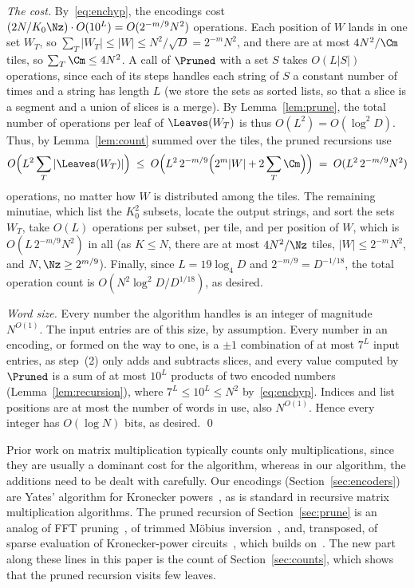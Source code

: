 \emph{The cost.} By~\eqref{eq:enchyp}, the encodings cost $(2N/K_0\Nz)\cdot O(10^L)=O(2^{-m/9}N^2)$ operations. Each position of $W$ lands in one set $W_T$, so $\sum_T|W_T|\le|W|\le N^2/\sqrt D=2^{-m}N^2$, and there are at most $4N^2/\Cm$ tiles, so $\sum_T\Cm\le4N^2$. A call of $\Pruned$ with a set $S$ takes $O(L|S|)$ operations, since each of its steps handles each string of $S$ a constant number of times and a string has length $L$ (we store the sets as sorted lists, so that a slice is a segment and a union of slices is a merge). By Lemma~\ref{lem:prune}, the total number of operations per leaf of $\Leaves(W_T)$ is thus $O(L^2)=O(\log^2\!D)$. Thus, by Lemma~\ref{lem:count} summed over the tiles, the pruned recursions use
\[
O\Big(L^2\sum_T|\Leaves(W_T)|\Big)\;\le\;O\Big(L^2\,2^{-m/9}\Big(2^m|W|+2\sum_T\Cm\Big)\Big)\;=\;O(L^2\,2^{-m/9}N^2)
\]
operations, no matter how $W$ is distributed among the tiles. The remaining minutiae, which list the $K_0^2$ subsets, locate the output strings, and sort the sets $W_T$, take $O(L)$ operations per subset, per tile, and per position of $W$, which is $O(L\,2^{-m/9}N^2)$ in all (as $K\le N$, there are at most $4N^2/\Nz$ tiles, $|W|\le2^{-m}N^2$, and $N,\Nz\ge2^{m/9}$). Finally, since $L=19\log_4D$ and $2^{-m/9}=D^{-1/18}$, the total operation count is $O(N^2\log^2\!D/D^{1/18})$, as desired.

\emph{Word size.} Every number the algorithm handles is an integer of magnitude $N^{O(1)}$. The input entries are of this size, by assumption. Every number in an encoding, or formed on the way to one, is a $\pm1$ combination of at most $7^L$ input entries, as step~(2) only adds and subtracts slices, and every value computed by $\Pruned$ is a sum of at most $10^L$ products of two encoded numbers (Lemma~\ref{lem:recursion}), where $7^L\le10^L\le N^2$ by~\eqref{eq:enchyp}. Indices and list positions are at most the number of words in use, also $N^{O(1)}$. Hence every integer has $O(\log N)$ bits, as desired. \qed

\begin{remark}
Prior work on matrix multiplication typically counts only multiplications, since they are usually a dominant cost for the algorithm, whereas in our algorithm, the additions need to be dealt with carefully. Our encodings (Section~\ref{sec:encoders}) are Yates' algorithm for Kronecker powers~\cite{Yat37,Goo58}, as is standard in recursive matrix multiplication algorithms. The pruned recursion of Section~\ref{sec:prune} is an analog of FFT pruning~\cite{Mar71,SB93}, of trimmed M\"obius inversion~\cite{BHKK10}, and, transposed, of sparse evaluation of Kronecker-power circuits~\cite{AL25}, which builds on~\cite{Wil24}. The new part along these lines in this paper is the count of Section~\ref{sec:counts}, which shows that the pruned recursion visits few leaves.
\end{remark}
